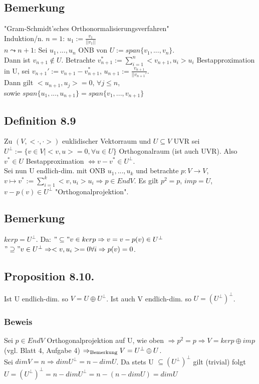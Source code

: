 \documentclass[a4paper, 12pt]{extarticle}
\newcommand{\tn}[1]{\textnormal {#1}}
\begin{document}
\subsection*{Bemerkung}
"Gram-Schmidt'sches Orthonormalisierungsverfahren" \\
Induktion/n. $n=1$: $u_1 := \frac{v_1}{||v_1||}$ \\
$n \leadsto n+1$: Sei $u_1,..., u_n$ ONB von $U:=span\{v_1,...,v_n\}$. \\
Dann ist $v_{n+1} \notin U$. Betrachte $v^*_{n+1} := \sum_{i=1}^n <v_{n+1}, u_i>u_i$ Bestapproximation in U, sei $v_{n+1}' := v_{n+1} - v^*_{n+1}$, $u_{n+1} := \frac{v_{n+1}}{||v_{n+1}'}$. \\
Dann gilt $<u_{n+1}, u_j> = 0$, $\forall j \leq n$, \\
sowie $span \{u_1,...,u_{n+1}\} = span \{v_1,...,v_{n+1}\}$
\subsection*{Definition 8.9}
Zu  $(V, <\cdot , \cdot >)$ euklidischer Vektorraum und $U \subseteq V$ UVR sei $U^\perp := \{v\in V| <v,u>=0, \forall u\in U\}$ Orthogonalraum (ist auch UVR). Also $v^*\in U$ Bestapproximation $\Leftrightarrow v-v^* \in U^\perp$. \\
Sei nun U endlich-dim. mit ONB $u_1,...,u_k$ und betrachte $p:V\to V$, $v \mapsto v^*:= \sum_{i=1}^k<v, u_i>u_i \Rightarrow p\in EndV$. Es gilt $p^2=p$, $imp = U$, $v-p(v)\in U^\perp$ "Orthogonalprojektion".
\subsection*{Bemerkung}
$ker p = U^\perp$. Da: $"\subseteq" v\in kerp \Rightarrow v=v-p(v)\in U^\perp$ \\
$"\supseteq" v \in U^\perp \Rightarrow <v, u_i> = 0\forall i \Rightarrow p(v)=0$.
\subsection*{Proposition 8.10.}
Ist U endlich-dim. so $V=U\oplus U^\perp$.
Ist auch V endlich-dim. so $U = (U^\perp)^\perp$.
\subsubsection{Beweis}
Sei $p\in EndV$ Orthogonalprojektion auf U, wie oben $\Rightarrow p^2=p \Rightarrow V=ker p \oplus im p$ (vgl. Blatt 4, Aufgabe 4) $\Rightarrow_{\tn{Bemerkung}} V = U^\perp \oplus U$. \\
Sei $dimV = n \Rightarrow dim U^\perp = n - dim U$.
Da stets U $\subseteq (U^\perp)^\perp$ gilt (trivial) folgt $U = (U^\perp)^\perp = n- dim U^\perp = n - (n- dimU) = dim U$ 
\end{document}
